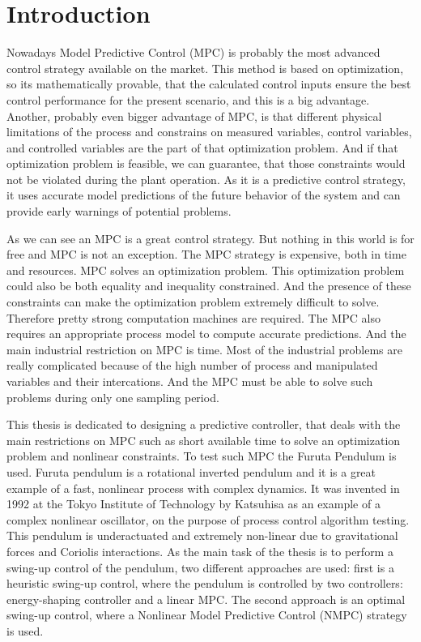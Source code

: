 \chapter{Introduction}
\label{ch:intro}
Nowadays Model Predictive Control (MPC) is probably the most advanced control strategy available on the market. This method is based on optimization, so its mathematically provable, that  the calculated control inputs ensure the best control performance for the present scenario, and this is a big advantage. Another, probably even bigger advantage of MPC, is that different physical limitations of the process and constrains on measured variables, control variables, and controlled variables are the part of that optimization problem. And if that optimization problem is feasible, we can guarantee, that those constraints would not be violated during the plant operation. As it is a predictive control strategy, it uses accurate model predictions of the future behavior of the system and can provide early warnings of potential problems.

As we can see an MPC is a great control strategy. But nothing in this world is for free and MPC is not an exception. The MPC strategy is expensive, both in time and resources. MPC solves an optimization problem. This optimization problem could also be both equality and inequality constrained. And the presence of these constraints can make the optimization problem extremely difficult to solve. Therefore pretty strong computation machines are required. The MPC also requires an appropriate process model to compute accurate predictions. And the main industrial restriction on MPC is time. Most of the industrial problems are really complicated because of the high number of process and manipulated variables and their intercations. And the MPC must be able to solve such problems during only one sampling period.

This thesis is dedicated to designing a predictive controller, that deals with the main restrictions on MPC such as short available time to solve an optimization problem and nonlinear constraints. To test such MPC the Furuta Pendulum is used. Furuta pendulum is a rotational inverted pendulum and it is a great example of a fast, nonlinear process with complex dynamics. It was invented in 1992 at the Tokyo Institute of Technology by Katsuhisa as an example of a complex nonlinear oscillator, on the purpose of process control algorithm testing. This pendulum is underactuated and extremely non-linear due to gravitational forces and Coriolis interactions. As the main task of the thesis is to perform a swing-up control of the pendulum, two different approaches are used: first is a heuristic swing-up control, where the pendulum is controlled by two controllers: energy-shaping controller and a linear MPC. The second approach is an optimal swing-up control, where a Nonlinear Model Predictive Control (NMPC) strategy is used.

